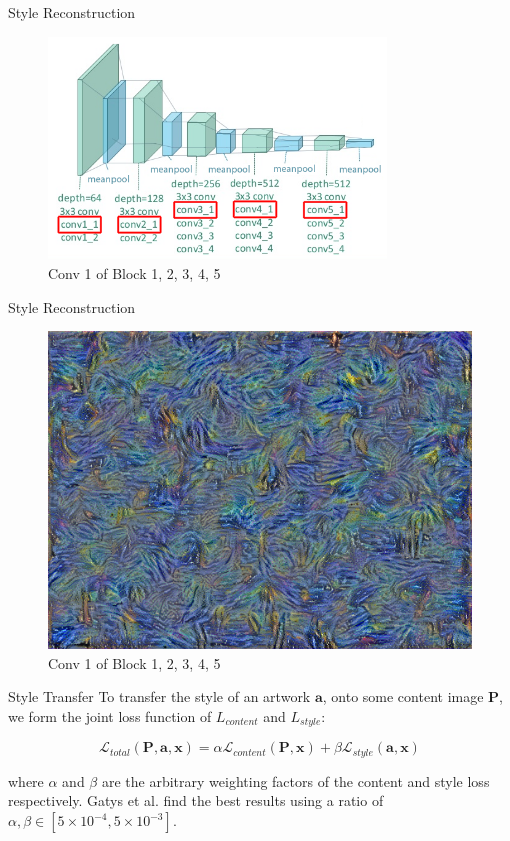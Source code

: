 \documentclass{beamer}
\begin{document}
\begin{frame}{Style Reconstruction}
\begin{figure}[ht]
\centering
\includegraphics[width=0.8\textwidth]{img/vgg19/style/block5_conv1}
\caption*{Conv 1 of Block 1, 2, 3, 4, 5}
\end{figure}
\end{frame}
\begin{frame}{Style Reconstruction}
\begin{figure}[ht]
\centering
\includegraphics[width=.8\textwidth]{img/style/block5_conv1}
\caption*{Conv 1 of Block 1, 2, 3, 4, 5}
\end{figure}
\end{frame}



\begin{frame}{Style Transfer}
To transfer the style of an artwork $\textbf{a}$, onto some content image
$\textbf{P}$, we form the joint loss function of $L_{content}$ and
$L_{style}$:

\begin{equation}
    \mathcal{L}_{total}(\mathbf{P}, \mathbf{a}, \mathbf{x}) =
    \alpha \mathcal{L}_{content}(\mathbf{P}, \mathbf{x}) +
    \beta \mathcal{L}_{style}(\mathbf{a}, \mathbf{x})
\end{equation}

where $\alpha$ and $\beta$ are the arbitrary weighting factors of the content
and style loss respectively. Gatys et al. find the best results using a ratio
of $\alpha, \beta \in [5\times10^{-4}, 5\times10^{-3}]$.
\end{frame}
\end{document}
